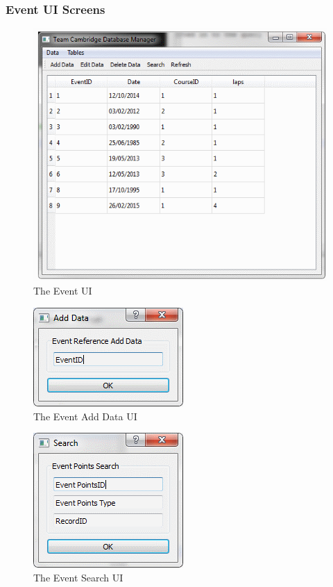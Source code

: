\subsubsection{Event UI Screens}

\begin{figure}[H]
\includegraphics{./Maintenance/UI/Event.png}
\caption{The Event UI} \label{fig:Event_UI}
\end{figure}

\begin{figure}[H]
\includegraphics{./Maintenance/UI/EventAD.png}
\caption{The Event Add Data UI} \label{fig:EventAD_UI}
\end{figure}

\begin{figure}[H]
\includegraphics{./Maintenance/UI/EventSearch.png}
\caption{The Event Search UI} \label{fig:EventSearch_UI}
\end{figure}


